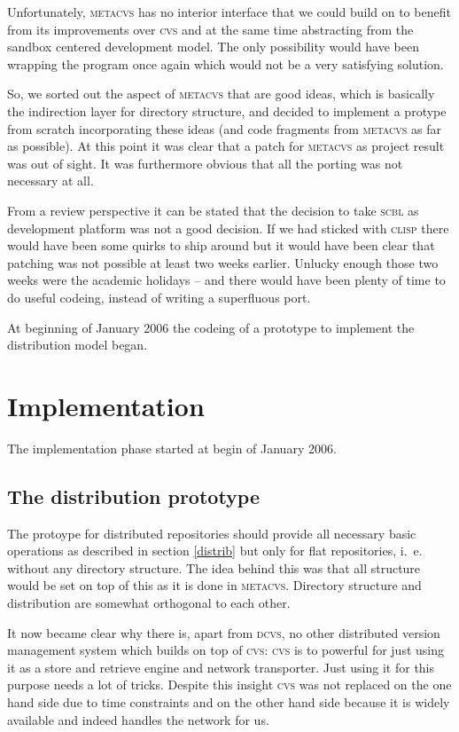 \documentclass[fleqn, 10pt, a4paper]{report} \usepackage{amssymb}
\begin{document}
Unfortunately, \textsc{metacvs} has no interior interface that we could
build on to benefit from its improvements over \textsc{cvs} and at the
same time abstracting from the sandbox centered development model. The
only possibility would have been wrapping the program once again which
would not be a very satisfying solution.

So, we sorted out the aspect of \textsc{metacvs} that are good
ideas, which is basically the indirection layer for directory
structure, and decided to implement a protype from scratch
incorporating these ideas (and code fragments from \textsc{metacvs} as
far as possible). At this point it was clear that a patch for
\textsc{metacvs} as project result was out of sight. It was
furthermore obvious that all the porting was not necessary at all.

From a review perspective it can be stated that the decision to take
\textsc{scbl} as development platform was not a good decision. If we
had sticked with \textsc{clisp} there would have been some quirks to
ship around but it would have been clear that patching was not
possible at least two weeks earlier. Unlucky enough those two weeks
were the academic holidays -- and there would have been plenty of time
to do useful codeing, instead of writing a superfluous port.

At beginning of January 2006 the codeing of a prototype to implement
the distribution model began.


\section{Implementation}

The implementation phase started at begin of January 2006.


\subsection{The distribution prototype}

The protoype for distributed repositories should provide all necessary
basic operations as described in section \ref{distrib} but only for
flat repositories, i.~e. without any directory structure. The idea
behind this was that all structure would be set on top of this as it
is done in \textsc{metacvs}. Directory structure and distribution are
somewhat orthogonal to each other.

It now became clear why there is, apart from \textsc{dcvs}, no other
distributed version management system which builds on top of
\textsc{cvs}: \textsc{cvs} is to powerful for just using it as a store
and retrieve engine and network transporter. Just using it for this
purpose needs a lot of tricks. Despite this insight \textsc{cvs} was
not replaced on the one hand side due to time constraints and on the
other hand side because it is widely available and indeed handles the
network for us.
\end{document}
